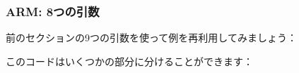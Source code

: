 \subsubsection{ARM: 8つの引数}

前のセクションの9つの引数を使って例を再利用してみましょう：



\myparagraph{\OptimizingKeilVI: \ARMMode}



このコードはいくつかの部分に分けることができます：

